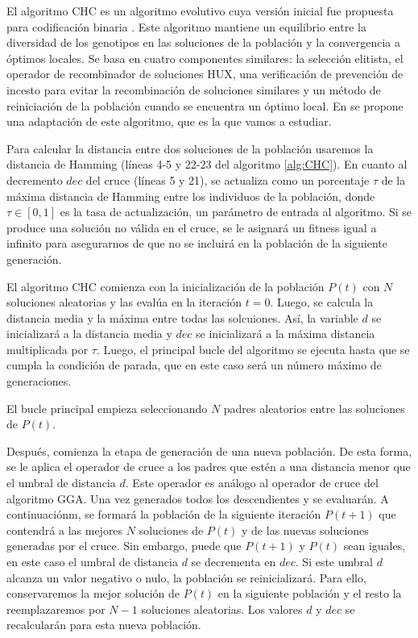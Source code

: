 El algoritmo CHC es un algoritmo evolutivo cuya versión inicial fue propuesta para codificación binaria \cite{CHC_1991}. Este algoritmo mantiene un equilibrio entre la diversidad de los genotipos en las soluciones de la población y la convergencia a óptimos locales. Se basa en cuatro componentes similares: la selección elitista, el operador de recombinador de soluciones HUX, una verificación de prevención de incesto para evitar la recombinación de soluciones similares y un método de reiniciación de la población cuando se encuentra un óptimo local. En \cite{Cuellar_etal} se propone una adaptación de este algoritmo, que es la que vamos a estudiar.

Para calcular la distancia entre dos soluciones de la población usaremos la distancia de Hamming (líneas 4-5 y 22-23 del algoritmo \ref{alg:CHC}). En cuanto al decremento $dec$ del cruce (líneas 5 y 21), se actualiza como un porcentaje $\tau$ de la máxima distancia de Hamming entre los individuos de la población, donde $\tau \in [0,1]$ es la tasa de actualización, un parámetro de entrada al algoritmo. Si se produce una solución no válida en el cruce, se le asignará un fitness igual a infinito para asegurarnos de que no se incluirá en la población de la siguiente generación.

El algoritmo CHC comienza con la inicialización de la población $P(t)$ con $N$ soluciones aleatorias y las evalúa en la iteración $t = 0$. Luego, se calcula la distancia media y la máxima entre todas las solcuiones. Así, la variable $d$ se inicializará a la distancia media y $dec$ se inicializará a la máxima distancia multiplicada por $\tau$. Luego, el principal bucle del algoritmo se ejecuta hasta que se cumpla la condición de parada, que en este caso será un número máximo de generaciones.

El bucle principal empieza seleccionando $N$ padres aleatorios entre las soluciones de $P(t)$.

Después, comienza la etapa de generación de una nueva población. De esta forma, se le aplica el operador de cruce a los padres que estén a una distancia menor que el umbral de distancia $d$. Este operador es análogo al operador de cruce del algoritmo GGA. Una vez generados todos los descendientes y se evaluarán. A continuaciónm, se formará la población de la siguiente iteración $P(t+1)$ que contendrá a las mejores $N$ soluciones de $P(t)$ y de las nuevas soluciones generadas por el cruce. Sin embargo, puede que $P(t+1)$ y $P(t)$ sean iguales, en este caso el umbral de distancia $d$ se decrementa en $dec$. Si este umbral $d$ alcanza un valor negativo o nulo, la población se reinicializará. Para ello, conservaremos la mejor solución de $P(t)$ en la siguiente población y el resto la reemplazaremos por $N-1$ soluciones aleatorias. Los valores $d$ y $dec$ se recalcularán para esta nueva población.

